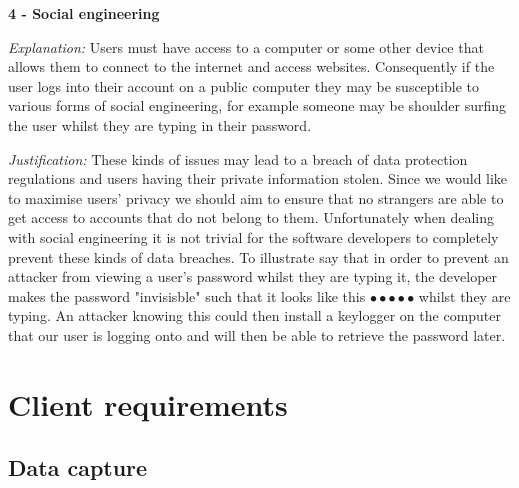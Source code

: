 \textsf{\bfseries 4 - Social engineering} \\ \vspace{0.1cm}

\textit{Explanation:}
Users must have access to a computer or some other device that
allows them to connect to the internet and access websites. 
Consequently if the user logs into their account on a public 
computer they may be susceptible to various forms of social 
engineering, for example someone may be shoulder surfing the 
user whilst they are typing in their password. \vspace{0.1cm}

\textit{Justification:}
These kinds of issues may lead to a breach of data protection
regulations and users having their private information stolen.
Since we would like to maximise users' privacy we should aim 
to ensure that no strangers are able to get access to accounts
that do not belong to them. Unfortunately when dealing with 
social engineering it is not trivial for the software 
developers to completely prevent these kinds of data breaches.
To illustrate say that in order to prevent an attacker from 
viewing a user's password whilst they are typing it, the 
developer makes the password "invisisble" such that it looks
like this  $\bullet \bullet \bullet \bullet \bullet$ whilst
they are typing. An attacker knowing this could then install 
a keylogger on the computer that our user is logging onto and
will then be able to retrieve the password later.

\section{Client requirements}

\subsection{Data capture}

